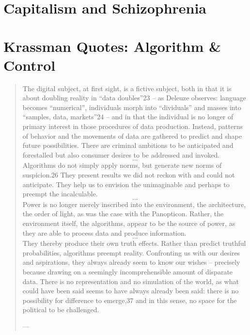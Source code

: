 



\section{Capitalism and Schizophrenia}



\section{Krassman Quotes: Algorithm \& Control}
\begin{quote}
	The digital subject, at first sight, is a fictive subject, both in that it is about doubling reality in “data doubles”23 – as Deleuze observes: language becomes “numerical”, individuals morph into “dividuals” and masses into “samples, data, markets”24 – and in that the individual is no longer of primary interest in those procedures of data production. Instead, patterns of behavior and the movements of data are gathered to predict and shape future possibilities. There are criminal ambitions to be anticipated and forestalled but also consumer desires to be addressed and invoked. \[...\] Algorithms do not simply apply norms, but generate new norms of suspicion.26 They present results we did not reckon with and could not anticipate. They help us to envision the unimaginable and perhaps to preempt the incalculable. \[...\] Power is no longer merely inscribed into the environment, the architecture, the order of light, as was the case with the Panopticon. Rather, the environment itself, the algorithms, appear to be the source of power, as they are able to process data and produce information. \[...\] They thereby produce their own truth effects. Rather than predict truthful probabilities, algorithms preempt reality. Confronting us with our desires and aspirations, they always already seem to know our wishes – precisely because drawing on a seemingly incomprehensible amount of disparate data. There is no representation and no simulation of the world, as what could have been said seems to have always already been said: there is no possibility for difference to emerge,37 and in this sense, no space for the political to be challenged.

	— \cite[15-16]{Krasmann2017}
\end{quote}



